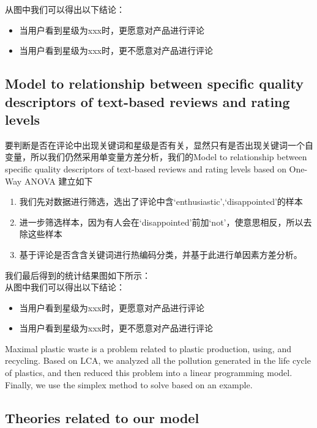 \documentclass{mcmthesis}
\begin{document}
从图中我们可以得出以下结论：
\begin{itemize}
	\item 当用户看到星级为xxx时，更愿意对产品进行评论
	\item 当用户看到星级为xxx时，更不愿意对产品进行评论
\end{itemize}

\subsection{Model to relationship between specific quality descriptors of text-based reviews and rating levels}
要判断是否在评论中出现关键词和星级是否有关，显然只有是否出现关键词一个自变量，所以我们仍然采用单变量方差分析，我们的Model to relationship between specific quality descriptors of text-based reviews and rating levels based on One-Way ANOVA 建立如下\\
\begin{enumerate}
	\item 我们先对数据进行筛选，选出了评论中含‘enthusiastic’,‘disappointed’的样本
	\item 进一步筛选样本，因为有人会在‘disappointed’前加‘not’，使意思相反，所以去除这些样本
	\item 基于评论是否含含关键词进行热编码分类，并基于此进行单因素方差分析。
\end{enumerate}
我们最后得到的统计结果图如下所示：\\

从图中我们可以得出以下结论：
\begin{itemize}
	\item 当用户看到星级为xxx时，更愿意对产品进行评论
	\item 当用户看到星级为xxx时，更不愿意对产品进行评论
\end{itemize}




Maximal plastic waste is a problem related to plastic production, using, and recycling. Based on LCA, we analyzed all the pollution generated in the life cycle of plastics, and then reduced this problem into a linear programming model. Finally, we use the simplex method to solve based on an example.

\subsection{Theories related to our model}
\end{document}
